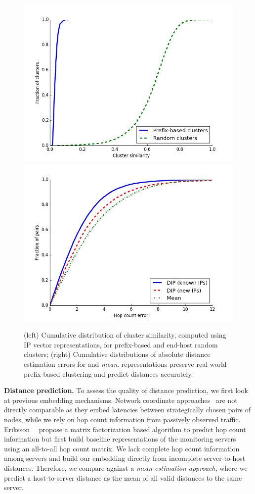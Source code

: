 \begin{figure}[t]
	\includegraphics[width=.45\linewidth]{Graph/dip/clustering.png}
	\includegraphics[width=.45\linewidth]{Graph/dip/AbsDiffKnown12Unknown.png}
	\caption{(left) Cumulative distribution of cluster similarity, computed using IP vector representations, for prefix-based and end-host random clusters; (right) Cumulative distributions of absolute distance estimation errors for \system{}  and {\em mean}. \system{} representations preserve real-world prefix-based clustering and predict distances accurately.}
	\label{fig:clustering}
\end{figure}


\textbf{Distance prediction.} To assess the quality of distance prediction, we first look at previous embedding mechanisms. Network coordinate approaches~\citep{vivaldi,gnp} are not directly comparable as they embed latencies between strategically chosen pairs of nodes, while we rely on hop count information from passively observed traffic. Eriksson~\etal{}~\citep{barford-infocom} propose a matrix factorization based algorithm to predict hop count information but first build baseline representations of the monitoring servers using an all-to-all hop count matrix. We lack complete hop count information among servers and build our embedding directly from incomplete server-to-host distances. Therefore, we compare against a {\em mean estimation approach}, where we predict a host-to-server distance as the mean of all valid distances to the same  server.


